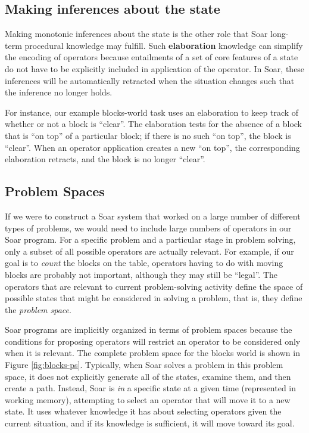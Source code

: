 \subsection{Making inferences about the state}

Making monotonic inferences about the state is the other role that Soar long-term procedural knowledge may fulfill. Such \textbf{elaboration} knowledge can simplify the encoding of operators because entailments of a set of core features of a state do not have to be explicitly included in application of the operator.  In Soar, these inferences will be automatically retracted when the situation changes such that the inference no longer holds.

For instance, our example blocks-world task uses an elaboration to keep track of whether or not a block is ``clear''. The elaboration tests for the absence of a block that is ``on top'' of a particular block; if there is no such ``on top'', the block is ``clear''. When an operator application creates a new ``on top'', the corresponding elaboration retracts, and the block is no longer ``clear''.


\subsection{Problem Spaces}
\label{ARCH-functions-ps}

If we were to construct a Soar system that worked on a large number of different types of problems, we would need to include large numbers of operators in our Soar program. For a specific problem and a particular stage in problem solving, only a subset of all possible operators are actually relevant. For example, if our goal is to \textit{count} the blocks on the table, operators having to do with moving blocks are probably not important, although they may still be ``legal''. The operators that are relevant to current problem-solving activity define the space of possible states that might be considered in solving a problem, that is, they define the \emph{problem space}.

Soar programs are implicitly organized in terms of problem spaces because the conditions for proposing operators will restrict an operator to be considered only when it is relevant.  The complete problem space for the blocks world is shown in Figure \ref{fig:blocks-ps}.  Typically, when Soar solves a problem in this problem space, it does not explicitly generate all of the states, examine them, and then create a path. Instead, Soar is \emph{in} a specific state at a given time (represented in working memory), attempting to select an operator that will move it to a new state.  It uses whatever knowledge it has about selecting operators given the current situation, and if its knowledge is sufficient, it will move toward its goal.

